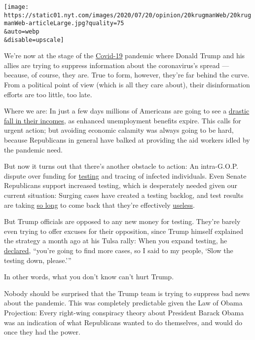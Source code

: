 \texttt{[image: https://static01.nyt.com/images/2020/07/20/opinion/20krugmanWeb/20krugmanWeb-articleLarge.jpg?quality=75\\\&auto=webp\\\&disable=upscale]}

We're now at the stage of the
\href{https://www.nytimes.com/2020/08/04/us/politics/coronavirus-trump-data-briefing.html}{Covid-19}
pandemic where Donald Trump and his allies are trying to suppress
information about the coronavirus's spread --- because, of course, they
are. True to form, however, they're far behind the curve. From a
political point of view (which is all they care about), their
disinformation efforts are too little, too late.

Where we are: In just a few days millions of Americans are going to see
a
\href{https://www.nytimes.com/2020/07/16/opinion/coronavirus-economy-unemployment.html}{drastic
fall in their incomes}, as enhanced unemployment benefits expire. This
calls for urgent action; but avoiding economic calamity was always going
to be hard, because Republicans in general have balked at providing the
aid workers idled by the pandemic need.

But now it turns out that there's another obstacle to action: An
intra-G.O.P. dispute over funding for
\href{https://www.nytimes.com/2020/07/18/us/politics/trump-virus-testing-relief-congress.html}{testing}
and tracing of infected individuals. Even Senate Republicans support
increased testing, which is desperately needed given our current
situation: Surging cases have created a testing backlog, and test
results are taking
\href{https://www.nytimes.com/2020/07/19/health/coronavirus-testing-viral-spread.html}{so
long} to come back that they're effectively
\href{https://medicalxpress.com/news/2020-07-contact-useless-speedy.html}{useless}.

But Trump officials are opposed to any new money for testing. They're
barely even trying to offer excuses for their opposition, since Trump
himself explained the strategy a month ago at his Tulsa rally: When you
expand testing, he
\href{https://www.nbcnews.com/politics/2020-election/trump-tells-tulsa-crowd-he-wanted-slow-down-covid-19-n1231658}{declared},
``you're going to find more cases, so I said to my people, `Slow the
testing down, please.'''

In other words, what you don't know can't hurt Trump.

Nobody should be surprised that the Trump team is trying to suppress bad
news about the pandemic. This was completely predictable given the Law
of Obama Projection: Every right-wing conspiracy theory about President
Barack Obama was an indication of what Republicans wanted to do
themselves, and would do once they had the power.

